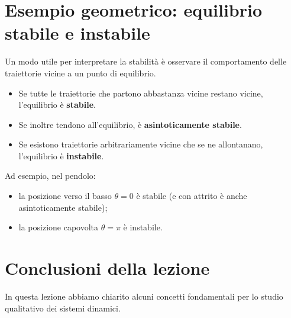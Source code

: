 \bigskip

\section{Esempio geometrico: equilibrio stabile e instabile}

Un modo utile per interpretare la stabilità è osservare il comportamento delle traiettorie vicine a un punto di equilibrio.

\begin{itemize}
    \item Se tutte le traiettorie che partono abbastanza vicine restano vicine, l'equilibrio è \textbf{stabile}.
    \item Se inoltre tendono all'equilibrio, è \textbf{asintoticamente stabile}.
    \item Se esistono traiettorie arbitrariamente vicine che se ne allontanano, l'equilibrio è \textbf{instabile}.
\end{itemize}

Ad esempio, nel pendolo:
\begin{itemize}
    \item la posizione verso il basso \(\theta=0\) è stabile (e con attrito è anche asintoticamente stabile);
    \item la posizione capovolta \(\theta=\pi\) è instabile.
\end{itemize}

\bigskip

\section{Conclusioni della lezione}

In questa lezione abbiamo chiarito alcuni concetti fondamentali per lo studio qualitativo dei sistemi dinamici.


